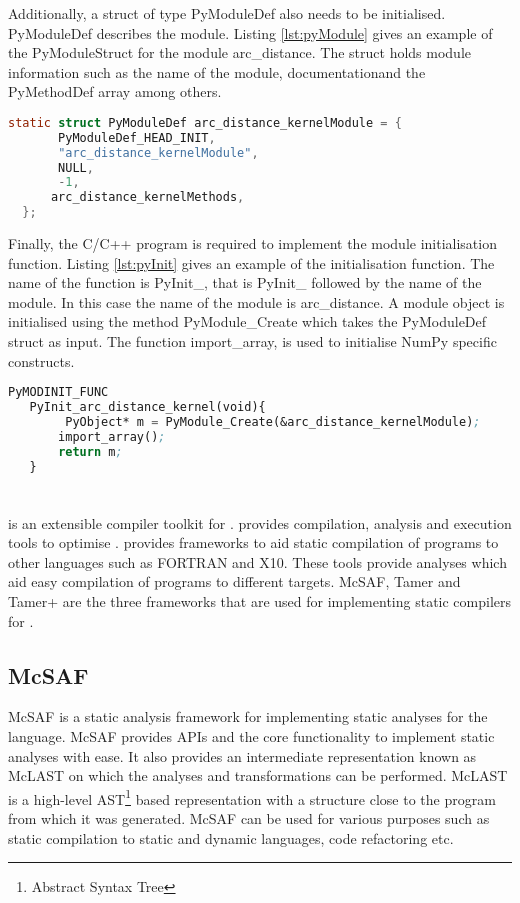Additionally, a struct of type PyModuleDef also needs to be initialised. PyModuleDef describes the module. Listing \ref{lst:pyModule} gives an example of the PyModuleStruct for the module arc\_distance. The struct holds module information such as the name of the module, documentationand the PyMethodDef array among others.
\begin{lstlisting}[language=C, label={lst:pyModule}, caption={Example of the PyModuleDef struct}]
 static struct PyModuleDef arc_distance_kernelModule = {
       PyModuleDef_HEAD_INIT,
       "arc_distance_kernelModule",
       NULL,
       -1,
      arc_distance_kernelMethods,
  };
\end{lstlisting}

 Finally, the C/C++ program is required to implement the module initialisation function. Listing \ref{lst:pyInit} gives an example of the initialisation function. The name of the function is PyInit\_<module name>, that is \textsf{PyInit\_} followed by the name of the module. In this case the name of the module is arc\_distance. A module object is initialised using the method PyModule\_Create which takes the PyModuleDef struct as input. The function import\_array, is used to initialise NumPy specific constructs. 
\begin{lstlisting}[language=lisp, label={lst:pyInit}, caption={Example of the module initialisation function for the module arc\_distance}]
 PyMODINIT_FUNC
   PyInit_arc_distance_kernel(void){
        PyObject* m = PyModule_Create(&arc_distance_kernelModule);
       import_array();
       return m;
   }

\end{lstlisting}
\section{\mclab}
\mclab is an extensible compiler toolkit for \matlab. \mclab provides compilation, analysis and execution tools to optimise \matlab. \mclab provides frameworks to aid static compilation of \matlab programs to other languages such as FORTRAN and X10. These tools provide analyses which aid easy compilation of \matlab programs to different targets. McSAF, Tamer and Tamer+ are the three frameworks that are used for implementing static compilers for \matlab. 
\subsection{McSAF}
McSAF is a static analysis framework for implementing static analyses for the \matlab language. McSAF provides APIs and the core functionality to implement static analyses with ease. It also provides an intermediate representation known as McLAST on which the analyses and transformations can be performed. McLAST is a high-level AST\footnote{Abstract Syntax Tree} based representation with a structure close to the \matlab program from which it was generated. McSAF can be used for various purposes such as static compilation to static and dynamic languages, code refactoring etc. 

